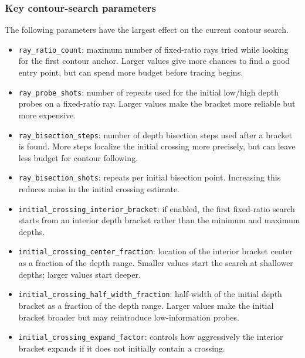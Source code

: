 \subsubsection{Key contour-search parameters}

The following parameters have the largest effect on the current contour search.

\begin{itemize}
    \item \texttt{ray\_ratio\_count}: maximum number of fixed-ratio rays tried
    while looking for the first contour anchor.  Larger values give more chances
    to find a good entry point, but can spend more budget before tracing begins.

    \item \texttt{ray\_probe\_shots}: number of repeats used for the initial
    low/high depth probes on a fixed-ratio ray.  Larger values make the bracket
    more reliable but more expensive.

    \item \texttt{ray\_bisection\_steps}: number of depth bisection steps used
    after a bracket is found.  More steps localize the initial crossing more
    precisely, but can leave less budget for contour following.

    \item \texttt{ray\_bisection\_shots}: repeats per initial bisection point.
    Increasing this reduces noise in the initial crossing estimate.

    \item \texttt{initial\_crossing\_interior\_bracket}: if enabled, the first
    fixed-ratio search starts from an interior depth bracket rather than the
    minimum and maximum depths.

    \item \texttt{initial\_crossing\_center\_fraction}: location of the interior
    bracket center as a fraction of the depth range.  Smaller values start the
    search at shallower depths; larger values start deeper.

    \item \texttt{initial\_crossing\_half\_width\_fraction}: half-width of the
    initial depth bracket as a fraction of the depth range.  Larger values make
    the initial bracket broader but may reintroduce low-information probes.

    \item \texttt{initial\_crossing\_expand\_factor}: controls how aggressively
    the interior bracket expands if it does not initially contain a crossing.


\end{itemize}
